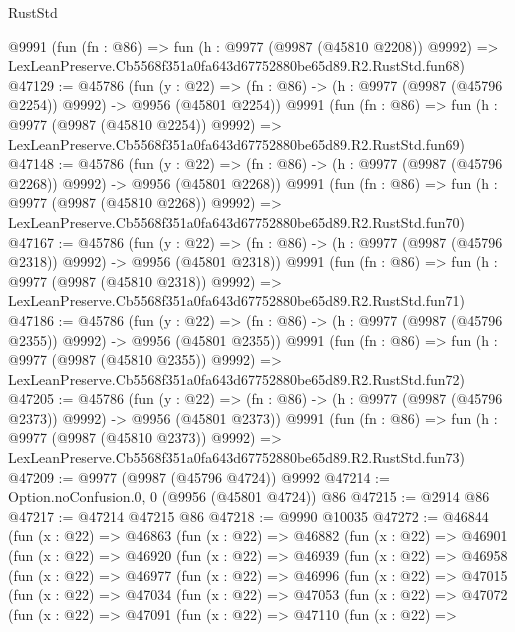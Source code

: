 \begin{lexlean}{RustStd}
\begin{coremodule}
    @9991
    (fun (fn : @86) =>
    fun (h : @9977 (@9987 (@45810 @2208)) @9992) =>
    LexLeanPreserve.Cb5568f351a0fa643d67752880be65d89.R2.RustStd.fun68)
@47129 := @45786
    (fun (y : @22) =>
    (fn : @86) -> (h : @9977 (@9987 (@45796 @2254)) @9992) -> @9956 (@45801 @2254))
    @9991
    (fun (fn : @86) =>
    fun (h : @9977 (@9987 (@45810 @2254)) @9992) =>
    LexLeanPreserve.Cb5568f351a0fa643d67752880be65d89.R2.RustStd.fun69)
@47148 := @45786
    (fun (y : @22) =>
    (fn : @86) -> (h : @9977 (@9987 (@45796 @2268)) @9992) -> @9956 (@45801 @2268))
    @9991
    (fun (fn : @86) =>
    fun (h : @9977 (@9987 (@45810 @2268)) @9992) =>
    LexLeanPreserve.Cb5568f351a0fa643d67752880be65d89.R2.RustStd.fun70)
@47167 := @45786
    (fun (y : @22) =>
    (fn : @86) -> (h : @9977 (@9987 (@45796 @2318)) @9992) -> @9956 (@45801 @2318))
    @9991
    (fun (fn : @86) =>
    fun (h : @9977 (@9987 (@45810 @2318)) @9992) =>
    LexLeanPreserve.Cb5568f351a0fa643d67752880be65d89.R2.RustStd.fun71)
@47186 := @45786
    (fun (y : @22) =>
    (fn : @86) -> (h : @9977 (@9987 (@45796 @2355)) @9992) -> @9956 (@45801 @2355))
    @9991
    (fun (fn : @86) =>
    fun (h : @9977 (@9987 (@45810 @2355)) @9992) =>
    LexLeanPreserve.Cb5568f351a0fa643d67752880be65d89.R2.RustStd.fun72)
@47205 := @45786
    (fun (y : @22) =>
    (fn : @86) -> (h : @9977 (@9987 (@45796 @2373)) @9992) -> @9956 (@45801 @2373))
    @9991
    (fun (fn : @86) =>
    fun (h : @9977 (@9987 (@45810 @2373)) @9992) =>
    LexLeanPreserve.Cb5568f351a0fa643d67752880be65d89.R2.RustStd.fun73)
@47209 := @9977 (@9987 (@45796 @4724)) @9992
@47214 := Option.noConfusion.{0, 0} (@9956 (@45801 @4724)) @86
@47215 := @2914 @86
@47217 := @47214 @47215 @86
@47218 := @9990 @10035
@47272 := @46844
    (fun (x : @22) =>
    @46863
      (fun (x : @22) =>
      @46882
        (fun (x : @22) =>
        @46901
          (fun (x : @22) =>
          @46920
            (fun (x : @22) =>
            @46939
              (fun (x : @22) =>
              @46958
                (fun (x : @22) =>
                @46977
                  (fun (x : @22) =>
                  @46996
                    (fun (x : @22) =>
                    @47015
                      (fun (x : @22) =>
                      @47034
                        (fun (x : @22) =>
                        @47053
                          (fun (x : @22) =>
                          @47072
                            (fun (x : @22) =>
                            @47091
                              (fun (x : @22) =>
                              @47110
                                (fun (x : @22) =>

\end{coremodule}
\end{lexlean}
